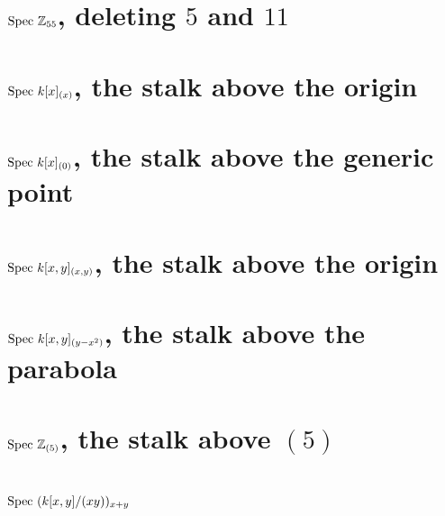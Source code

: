 
\section{$\text{Spec } \mathbb Z_{55}$, deleting $5$ and $11$}

\section{$\text{Spec } k[x]_{(x)}$, the stalk above the origin}
\section{$\text{Spec } k[x]_{(0)}$, the stalk above the generic point}
\section{$\text{Spec } k[x,y]_{(x,y)}$, the stalk above the origin}
\section{$\text{Spec } k[x,y]_{(y-x^2)}$, the stalk above the parabola}
\section{$\text{Spec } \mathbb Z_{(5)}$, the stalk above $(5)$}



\section{\problemhead}
$\text{Spec } (k[x,y]/(xy))_{x+y}$
